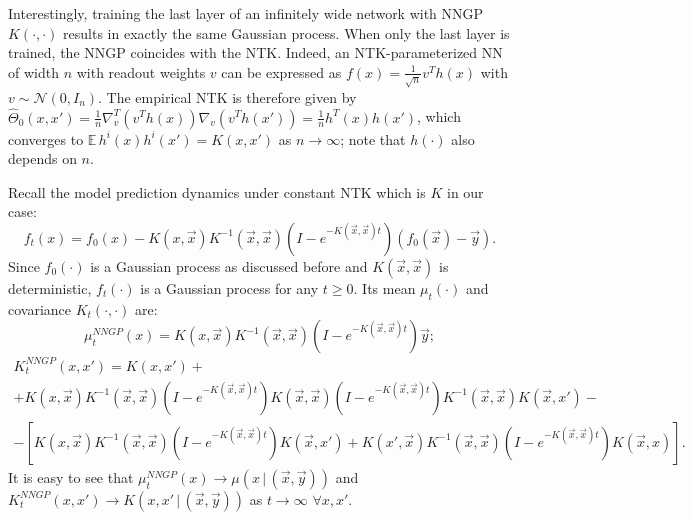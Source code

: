 \documentclass{article}
\newcommand{\EE}{\mathbb{E}\,}
\newcommand{\NN}{\mathcal{N}}
\begin{document}
    Interestingly, training the last layer of an infinitely wide network with NNGP $K(\cdot,\cdot)$ results in exactly the same Gaussian process.
    When only the last layer is trained, the NNGP coincides with the NTK.
    Indeed, an NTK-parameterized NN of width $n$ with readout weights $v$ can be expressed as $f(x) = \frac{1}{\sqrt{n}} v^T h(x)$ with $v \sim \NN(0, I_n)$.
    The empirical NTK is therefore given by $\hat\Theta_0(x,x') = \frac{1}{n} \nabla^T_v (v^T h(x)) \nabla_v (v^T h(x')) = \frac{1}{n} h^T(x) h(x')$, which converges to $\EE h^i(x) h^i(x') = K(x,x')$ as $n \to \infty$; note that $h(\cdot)$ also depends on $n$.
    
    Recall the model prediction dynamics under constant NTK which is $K$ in our case:
    \begin{equation}
        f_t(x) = f_0(x) - K(x,\vec x) K^{-1}(\vec x,\vec x) \left(I - e^{-K(\vec x,\vec x) t}\right) (f_0(\vec x) - \vec y).
    \end{equation}
    Since $f_0(\cdot)$ is a Gaussian process as discussed before and $K(\vec x,\vec x)$ is deterministic, $f_t(\cdot)$ is a Gaussian process for any $t \geq 0$.
    Its mean $\mu_t(\cdot)$ and covariance $K_t(\cdot,\cdot)$ are:
    \begin{equation}
        \mu_t^{NNGP}(x) = K(x,\vec x) K^{-1}(\vec x,\vec x) \left(I - e^{-K(\vec x,\vec x) t}\right) \vec y;
    \end{equation}
    \begin{multline}
        K_t^{NNGP}(x,x') 
        = K(x,x') 
        +\\+ K(x,\vec x) K^{-1}(\vec x,\vec x) \left(I - e^{-K(\vec x,\vec x) t}\right) K(\vec x,\vec x) \left(I - e^{-K(\vec x,\vec x) t}\right) K^{-1}(\vec x,\vec x) K(\vec x,x') 
        -\\- \left[K(x,\vec x) K^{-1}(\vec x,\vec x) \left(I - e^{-K(\vec x,\vec x) t}\right) K(\vec x,x') + K(x',\vec x) K^{-1}(\vec x,\vec x) \left(I - e^{-K(\vec x,\vec x) t}\right) K(\vec x,x)\right].
    \end{multline}
    It is easy to see that $\mu_t^{NNGP}(x) \to \mu(x \,|\, (\vec x, \vec y))$ and $K_t^{NNGP}(x,x') \to K(x,x' \,|\, (\vec x, \vec y))$ as $t \to \infty$ $\forall x,x'$.
\end{document}
